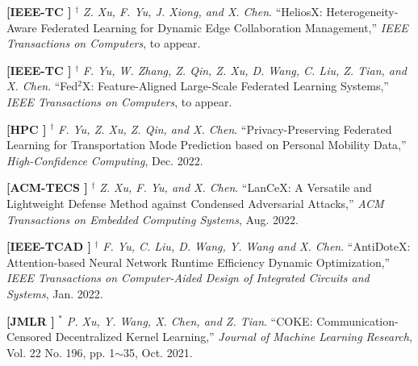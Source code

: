 	\textbf{[IEEE-TC ]}
	$^\dagger$
	\textsl{Z. Xu, F. Yu, J. Xiong, and X. Chen}.
		``HeliosX\@: Heterogeneity-Aware Federated Learning for Dynamic Edge Collaboration Management,''
		\textsl{IEEE Transactions on Computers}, to appear.
			\vspace{-3mm}

	\textbf{[IEEE-TC ]}
	$^\dagger$
	\textsl{F. Yu, W. Zhang, Z. Qin, Z. Xu, D. Wang, C. Liu, Z. Tian, and X. Chen}.
		``Fed$^2$X: Feature-Aligned Large-Scale Federated Learning Systems,''
		\textsl{IEEE Transactions on Computers}, to appear.
			\vspace{-3mm}

	\textbf{[HPC ]}
	$^\dagger$
	\textsl{F. Yu, Z. Xu, Z. Qin, and X. Chen}.
		``Privacy-Preserving Federated Learning for Transportation Mode Prediction based on Personal Mobility Data,''
		\textsl{High-Confidence Computing}, Dec. 2022.
			\vspace{-3mm}

	\textbf{[ACM-TECS ]}
	$^\dagger$
	\textsl{Z. Xu, F. Yu, and X. Chen}.
		``LanCeX\@: A Versatile and Lightweight Defense Method against Condensed Adversarial Attacks,''
		\textsl{ACM Transactions on Embedded Computing Systems}, Aug. 2022.
			\vspace{-3mm}

	\textbf{[IEEE-TCAD ]}
	$^\dagger$
	\textsl{F. Yu, C. Liu, D. Wang, Y. Wang and X. Chen}.
		``AntiDoteX\@: Attention-based Neural Network Runtime Efficiency Dynamic Optimization,''
		\textsl{IEEE Transactions on Computer-Aided Design of Integrated Circuits and Systems}, Jan. 2022.
			\vspace{-3mm}

	\textbf{[JMLR ]}
	$^\ast$
	\textsl{P. Xu, Y. Wang, X. Chen, and Z. Tian}.
		``COKE\@: Communication-Censored Decentralized Kernel Learning,''
		\textsl{Journal of Machine Learning Research}, Vol. 22 No. 196, pp. 1$\sim$35, Oct. 2021.
			\vspace{-3mm}

